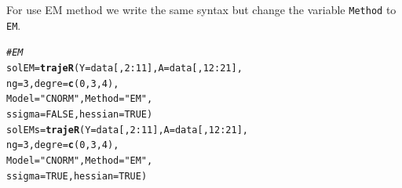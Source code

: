 \documentclass{article}\usepackage[]{graphicx}\usepackage[]{color}
\makeatletter
\newcommand{\hlnum}[1]{\textcolor[rgb]{0.686,0.059,0.569}{#1}}%
\newcommand{\hlstr}[1]{\textcolor[rgb]{0.192,0.494,0.8}{#1}}%
\newcommand{\hlcom}[1]{\textcolor[rgb]{0.678,0.584,0.686}{\textit{#1}}}%
\newcommand{\hlopt}[1]{\textcolor[rgb]{0,0,0}{#1}}%
\newcommand{\hlstd}[1]{\textcolor[rgb]{0.345,0.345,0.345}{#1}}%
\newcommand{\hlkwb}[1]{\textcolor[rgb]{0.69,0.353,0.396}{#1}}%
\newcommand{\hlkwc}[1]{\textcolor[rgb]{0.333,0.667,0.333}{#1}}%
\newcommand{\hlkwd}[1]{\textcolor[rgb]{0.737,0.353,0.396}{\textbf{#1}}}%
\newenvironment{kframe}{%
 \def\at@end@of@kframe{}%
 \ifinner\ifhmode%
  \def\at@end@of@kframe{\end{minipage}}%
  \begin{minipage}{\columnwidth}%
 \fi\fi%
 \def\FrameCommand##1{\hskip\@totalleftmargin \hskip-\fboxsep
 \colorbox{shadecolor}{##1}\hskip-\fboxsep
     \hskip-\linewidth \hskip-\@totalleftmargin \hskip\columnwidth}%
 \MakeFramed {\advance\hsize-\width
   \@totalleftmargin\z@ \linewidth\hsize
   \@setminipage}}%
 {\par\unskip\endMakeFramed%
 \at@end@of@kframe}
\newenvironment{knitrout}{}{} %
\makeatother
\begin{document}
For use EM method we write the same syntax but change the variable \verb|Method| to \verb|EM|.
\begin{knitrout}
\color{fgcolor}\begin{kframe}
\begin{alltt}
\hlcom{# EM}
\hlstd{solEM} \hlkwb{=} \hlkwd{trajeR}\hlstd{(}\hlkwc{Y} \hlstd{= data[,}\hlnum{2}\hlopt{:}\hlnum{11}\hlstd{],} \hlkwc{A} \hlstd{= data[,}\hlnum{12}\hlopt{:}\hlnum{21}\hlstd{],}
               \hlkwc{ng} \hlstd{=} \hlnum{3}\hlstd{,} \hlkwc{degre} \hlstd{=} \hlkwd{c}\hlstd{(}\hlnum{0}\hlstd{,}\hlnum{3}\hlstd{,}\hlnum{4}\hlstd{),}
               \hlkwc{Model} \hlstd{=} \hlstr{"CNORM"}\hlstd{,} \hlkwc{Method} \hlstd{=} \hlstr{"EM"}\hlstd{,}
               \hlkwc{ssigma} \hlstd{=} \hlnum{FALSE}\hlstd{,} \hlkwc{hessian} \hlstd{=} \hlnum{TRUE}\hlstd{)}
\hlstd{solEMs} \hlkwb{=} \hlkwd{trajeR}\hlstd{(}\hlkwc{Y} \hlstd{= data[,}\hlnum{2}\hlopt{:}\hlnum{11}\hlstd{],} \hlkwc{A} \hlstd{= data[,}\hlnum{12}\hlopt{:}\hlnum{21}\hlstd{],}
                \hlkwc{ng} \hlstd{=} \hlnum{3}\hlstd{,} \hlkwc{degre} \hlstd{=} \hlkwd{c}\hlstd{(}\hlnum{0}\hlstd{,}\hlnum{3}\hlstd{,}\hlnum{4}\hlstd{),}
                \hlkwc{Model} \hlstd{=} \hlstr{"CNORM"}\hlstd{,} \hlkwc{Method} \hlstd{=} \hlstr{"EM"}\hlstd{,}
                \hlkwc{ssigma} \hlstd{=} \hlnum{TRUE}\hlstd{,} \hlkwc{hessian} \hlstd{=} \hlnum{TRUE}\hlstd{)}
\end{alltt}
\end{kframe}
\end{knitrout}
\end{document}
